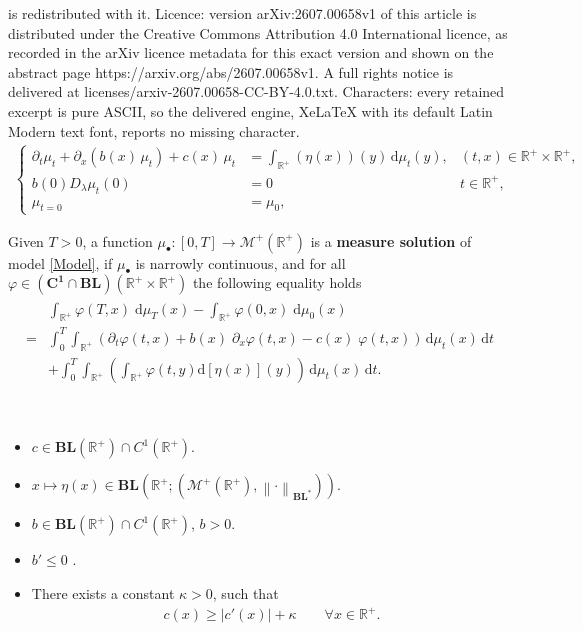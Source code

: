 \documentclass[10pt,a4paper]{amsart}
\newcommand{\BL}{\mathbf{BL}}
\newcommand{\BLN}{\mathbf{BL}}
\newcommand{\Cu}[1]{\mathbf{C^{#1}}}
\newcommand{\R}{\mathbb{R}}
\renewcommand{\d}[1]{\mathrm{d}{#1}}
\newcommand{\norma}[1]{{\left \|#1\right \|}}
\renewcommand{\phi}{\varphi}
\newcommand{\reali}{\mathbb{R}}
\newcommand{\ud}{\mathrm{d}}
\begin{document}
is redistributed with it. Licence: version arXiv:2607.00658v1 of this article is distributed under the Creative Commons Attribution 4.0 International licence, as recorded in the arXiv licence metadata for this exact version and shown on the abstract page https://arxiv.org/abs/2607.00658v1. A full rights notice is delivered at licenses/arxiv-2607.00658-CC-BY-4.0.txt. Characters: every retained excerpt is pure ASCII, so the delivered engine, XeLaTeX with its default Latin Modern text font, reports no missing character.
\begin{align}\label{Model}
\left\{\begin{array}{lll}
\partial_t \mu_t+\partial_x \left(b(x) \, \mu_t \right)+c(x)\,\mu_t &= \displaystyle\int_{\R^+} (\eta(x))(y)\, \ud\mu_t(y),& (t,x) \in  \R^+ \times \R^+,\\ 
    b(0)D_{\lambda}\mu_t(0)&= 0& t \in \R^+,\\
    \mu_{t=0}&=\mu_0,
\end{array}\right.
  \end{align}

\begin{definition}
 \label{def:WeakSolution}
Given $T>0$, a function $\mu_{\bullet} \colon [0,T] \to \mathcal{M}^+(\R^+)$ is a \textbf{measure solution}
of model \eqref{Model}, if $\mu_{\bullet}$ is narrowly continuous, and for all $\phi \in (\Cu{1}
 \cap \BL) \left(\reali^+\times \reali^+\right)$ the following equality holds 
 \begin{align}
 \begin{split}
 \label{Formulation:WeakSolution}
  & \int_{\reali^+} \phi(T,x) \; \d{\mu_T}(x) - \int_{\reali^+}
  \phi(0,x) \; \d{\mu_0}(x)\\
  =&\int_0^T \int_{\reali^+} \left(
   \partial_t \phi(t,x) + b(x) \; \partial_x
   \phi(t,x) - c(x) \; \phi(t,x) \right)\,\ud\mu_t(x)\,\ud{t}   \\
  &+ \int_0^T \int_{\reali^+} \left( \int_{\reali^+} \phi(t,y)
   \d{\left[\eta(x)\right]} (y) \right)\, \ud\mu_t(x)\,\ud{t}.
   \end{split}
\end{align}
\end{definition}

\begin{assumptions}\label{Assum} 
\ \begin{itemize}
\item[(i)] $c \in  \BL(\R^+)\cap C^1(\R^+)$.
\item[(ii)] $x\mapsto \eta(x) \in  \BL\left(\R^+; (\mathcal{M}^+(\R^+), \norma{\cdot}_{\BLN^*})\right)$.
\item[(iii)] $b \in  \BL(\R^+)\cap C^1(\R^+)$, $b>0$. 
\item[(iv)] $b' \leq 0$ .
\item [(v)] There exists a constant $\kappa>0$, such that 
    \begin{align*}
        c(x) \geq \left|c'(x)\right| + \kappa\qquad \forall x \in \R^+.
    \end{align*}
\end{itemize}
\end{assumptions}
\end{document}
